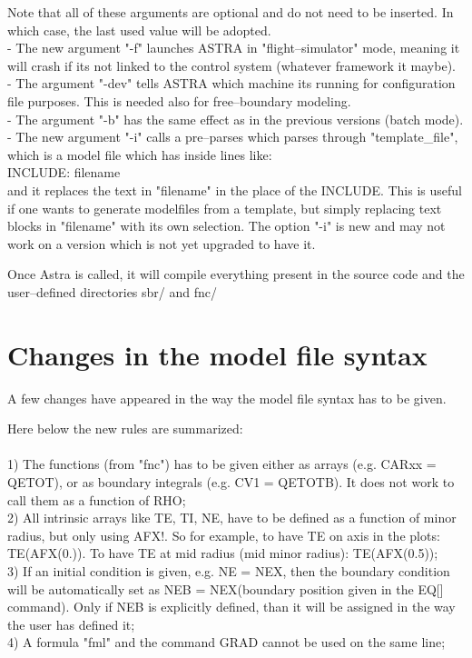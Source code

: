 \documentclass[12pt]{article}
\begin{document}
Note that all of these arguments are optional and do not need to be inserted. In which case, the last used value will be adopted.\\
- The new argument "-f" launches ASTRA in "flight--simulator" mode, meaning it will crash if its not linked to the control system (whatever framework it maybe). \\
- The argument "-dev" tells ASTRA which machine its running for configuration file purposes. This is needed also for free--boundary modeling.\\
- The argument "-b" has the same effect as in the previous versions (batch mode). 
- The new argument "-i" calls a pre--parses which parses through "template\_file", which is a model file which has inside lines like:\\
INCLUDE: filename \\
and it replaces the text in "filename" in the place of the INCLUDE. This is useful if one wants to generate modelfiles from a template, but simply replacing text blocks in "filename" with its own selection. The option "-i" is new and may not work on a version which is not yet upgraded to have it.

Once Astra is called, it will compile everything present in the source code and the user--defined directories sbr/ and fnc/ 

\section{Changes in the model file syntax}
A few changes have appeared in the way the model file syntax has to be given.

Here below the new rules are summarized:\\\\
1) The functions (from "fnc") has to be given either as arrays (e.g. CARxx = QETOT), or as boundary integrals (e.g. CV1 = QETOTB). It does not work to call them as a function of RHO; \\
2) All intrinsic arrays like TE, TI, NE, have to be defined as a function of minor radius, but only using AFX!. So for example, to have TE on axis in the plots: TE(AFX(0.)). To have TE at mid radius (mid minor radius): TE(AFX(0.5)); \\
3) If an initial condition is given, e.g. NE = NEX, then the boundary condition will be automatically set as NEB = NEX(boundary position given in the EQ[] command). Only if NEB is explicitly defined, than it will be assigned in the way the user has defined it; \\
4) A formula "fml" and the command GRAD cannot be used on the same line; \\
 
\end{document}
